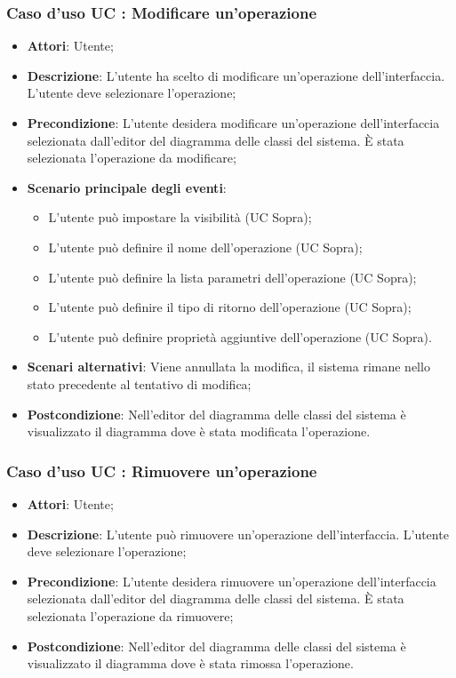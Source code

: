 \documentclass[../AnalisiDeiRequisiti.tex]{subfiles}
\begin{document}
		\subsubsection{Caso d'uso UC : Modificare un'operazione}
			\begin{itemize}
				\item \textbf{Attori}: Utente;
				\item \textbf{Descrizione}: L'utente ha scelto di modificare un'operazione
				dell'interfaccia. L'utente deve selezionare l'operazione;
				\item \textbf{Precondizione}: L'utente desidera modificare un'operazione
				dell'interfaccia selezionata dall'editor del diagramma delle classi del
				sistema. È stata selezionata l'operazione da modificare;
				\item \textbf{Scenario principale degli eventi}:
					\begin{itemize}
						\item L'utente può impostare la visibilità (UC Sopra);
						\item L'utente può definire il nome dell'operazione (UC Sopra);
						\item L'utente può definire la lista parametri dell'operazione (UC Sopra);
						\item L'utente può definire il tipo di ritorno dell'operazione (UC Sopra);
						\item L'utente può definire proprietà aggiuntive dell'operazione (UC Sopra).
					\end{itemize}
				\item \textbf{Scenari alternativi}: Viene annullata la modifica, il sistema
				rimane nello stato precedente al tentativo di modifica;
				\item \textbf{Postcondizione}: Nell'editor del diagramma delle classi del
				sistema è visualizzato il diagramma dove è stata modificata l'operazione.
			\end{itemize}
		\subsubsection{Caso d'uso UC : Rimuovere un'operazione}
			\begin{itemize}
				\item \textbf{Attori}: Utente;
				\item \textbf{Descrizione}: L'utente può rimuovere un'operazione
				dell'interfaccia. L'utente deve selezionare l'operazione;
				\item \textbf{Precondizione}: L'utente desidera rimuovere un'operazione
				dell'interfaccia selezionata dall'editor del diagramma delle classi del
				sistema. È stata selezionata l'operazione da rimuovere;
				\item \textbf{Postcondizione}: Nell'editor del diagramma delle classi del
				sistema è visualizzato il diagramma dove è stata rimossa l'operazione.
			\end{itemize}
\end{document}
